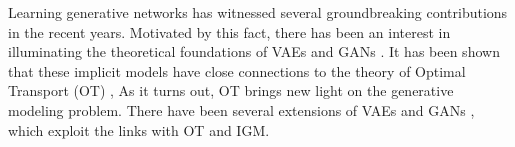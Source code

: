 





Learning generative networks has witnessed several groundbreaking contributions in the recent years. Motivated by this fact, there has been an interest in illuminating the theoretical foundations of VAEs and GANs \cite{bousquet2017optimal,liu2017approximation}. 
%
It has been shown that these implicit models have close connections to the theory of Optimal Transport (OT) \cite{villani2008optimal}, 
%
As it turns out, OT brings new light on the generative modeling problem. There have been several extensions of VAEs \cite{tolstikhin2017wasserstein,kolouri2018sliced} and GANs \cite{arjovsky2017wasserstein,gulrajani2017improved,guo2017relaxed,lei2017geometric}, which exploit the links with OT and IGM. 

